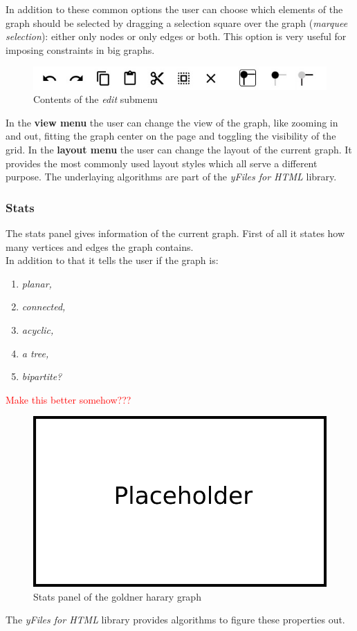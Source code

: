 In addition to these common options the user can choose which elements of the graph should be selected by dragging a selection square over the graph (\textit{marquee selection}): either only nodes or only edges or both. This option is very useful for imposing constraints in big graphs. 
\begin{figure}[!h]
\begin{center}
\includegraphics[scale=0.5]{figures/figIndex/EditToolbar.jpg}
\caption{Contents of the \textit{edit} submenu}
\label{img:viewtoolbar}
\end{center}
\end{figure}
In the \textbf{view menu} the user can change the view of the graph, like zooming in and out, fitting the graph center on the page and toggling the visibility of the grid.
In the \textbf{layout menu} the user can change the layout of the current graph. It provides the most commonly used layout styles which all serve a different purpose. The underlaying algorithms are part of the \textit{yFiles for HTML} library.
\subsubsection{Stats}
The stats panel gives information of the current graph. First of all it states how many vertices and edges the graph contains.\\
In addition to that it tells the user if the graph is:\\
\begin{enumerate}
\item \textit{planar,}
\item \textit{connected,}
\item \textit{acyclic,}
\item \textit{a tree,}
\item \textit{bipartite?}
\end{enumerate}
\textcolor{red}{Make this better somehow???}
\begin{figure}[!h]
\begin{center}
\includegraphics[width=1\textwidth]{figures/Platzhalter.png}
\caption{Stats panel of the goldner harary graph}
\label{img:plzhltr}
\end{center}
\end{figure}The \textit{yFiles for HTML} library provides algorithms to figure these properties out.
